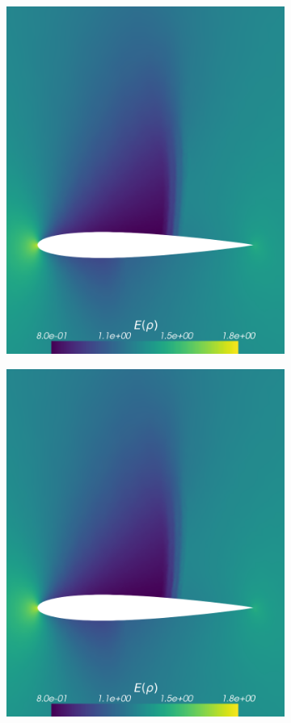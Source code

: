 \begin{figure}[h!]
\begin{subfigure}{0.3\linewidth}
		\includegraphics[scale=0.2]{figs/Euler1DPlots5/sg_4_9_ERho.png}
		\label{fig:sub2}
	\end{subfigure}%
	\hfill
	\begin{subfigure}{0.3\linewidth}
		\centering
		\includegraphics[scale=0.2]{figs/Euler1DPlots5/osIPM4-4_ERho.png}

\end{subfigure}
\end{figure}
